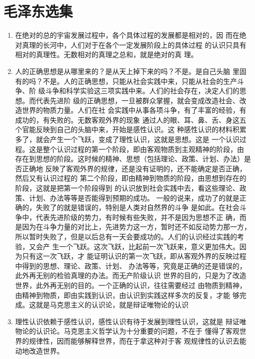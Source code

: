 \documentclass[UTF8]{ctexart}
\begin{document}
	\newpage

	\section{毛泽东选集}
	
	
		\begin{enumerate}
		
			\item 在绝对的总的宇宙发展过程中，各个具体过程的发展都是相对的，因
		而在绝对真理的长河中，人们对于在各个一定发展阶段上的具体过程
		的认识只具有相对的真理性。无数相对的真理之总和，就是绝对的真
		理。
		
			\item 人的正确思想是从哪里来的？是从天上掉下来的吗？不是。是自己头脑 
	    里固有的吗？不是。人的正确思想，只能从社会实践中来，只能从社会的生产斗争、阶
	    级斗争和科学实验这三项实践中来。人们的社会存在，决定人们的思想。而代表先进阶
		级的正确思想，一旦被群众掌握，就会变成改造社会、改造世界的物质力量。人们在社
		会实践中从事各项斗争，有了丰富的经验，有成功的，有失败的。无数客观外界的现象
		通过人的眼、耳、鼻、舌、身这五个官能反映到自己的头脑中来，开始是感性认识。这
		种感性认识的材料积累多了，就会产生一个飞跃，变成了理性认识，这就是思想。这是
		一个认识过程。这是整个认识过程的第一个阶段，即由客观物质到主观精神的阶段，由
		存在到思想的阶段。这时候的精神、思想（包括理论、政策、计划、办法）是否正确地
		反映了客观外界的规律，还是没有证明的，还不能确定是否正确，然后又有认识过程的
		第二个阶段，即由精神到物质的阶段，由思想到存在的阶段，这就是把第一个阶段得到
		的认识放到社会实践中去，看这些理论、政策、计划、办法等等是否能得到预期的成功。
		一般的说来，成功了的就是正确的，失败了的就是错误的，特别是人类对自然界的斗争
		是如此。在社会斗争中，代表先进阶级的势力，有时候有些失败，并不是因为思想不正
		确，而是因为在斗争力量的对比上，先进势力这一方，暂时还不如反动势力那一方，
		所以暂时失败了，但是以后总有一天会要成功的。人们的认识经过实践的考验，又会产
		生一个飞跃。这次飞跃，比起前一次飞跃来，意义更加伟大。因为只有这一次飞跃，才
		能证明认识的第一次飞跃，即从客观外界的反映过程中得到的思想、理论、政策、计划、
		办法等等，究竟是正确的还是错误的，此外再无别的检验真理的办法。而无产阶级认识
		世界的目的，只是为了改造世界，此外再无别的目的。一个正确的认识，往往需要经过
		由物质到精神，由精神到物质，即由实践到认识，由认识到实践这样多次的反复，才能
		够完成。这就是马克思主义的认识论，就是辩证唯物论的认识
		
			\item 理性认识依赖于感性认识，感性认识有待于发展到理性认识，这就是
		辩证唯物论的认识论。马克思主义哲学认为十分重要的问题，不在于
		懂得了客观世界的规律性，因而能够解释世界，而在于拿这种对于客
		观规律性的认识去能动地改造世界。
		
		\end{enumerate}
	
\end{document}
